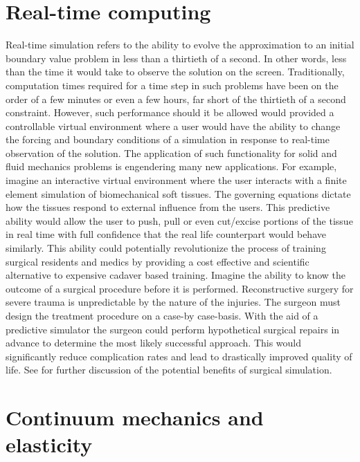 \documentclass[article]{pcms-l}
\begin{document}
\section*{Real-time computing}
Real-time simulation refers to the ability to evolve the approximation to an initial boundary value problem in less than a thirtieth of a second. In other words, less than the time it would take to observe the solution on the screen. Traditionally, computation times required for a time step in such problems have been on the order of a few minutes or even a few hours, far short of the thirtieth of a second constraint. However, such performance should it be allowed would provided a controllable virtual environment where a user would have the ability to change the forcing and boundary conditions of a simulation in response to real-time observation of the solution. The application of such functionality for solid and fluid mechanics problems is engendering many new applications. For example, imagine an interactive virtual environment where the user interacts with a finite element simulation of biomechanical soft tissues. The governing equations dictate how the tissues respond to external influence from the users. This predictive ability would allow the user to push, pull or even cut/excise portions of the tissue in real time with full confidence that the real life counterpart would behave similarly. This ability could potentially revolutionize the process of training surgical residents and medics by providing a cost effective and scientific alternative to expensive cadaver based training. Imagine the ability to know the outcome of a surgical procedure before it is performed. Reconstructive surgery for severe trauma is unpredictable by the nature of the injuries. The surgeon must design the treatment procedure on a case-by case-basis. With the aid of a predictive simulator the surgeon could perform hypothetical surgical repairs in advance to determine the most likely successful approach. This would significantly reduce complication rates and lead to drastically improved quality of life. See \cite{SHTOC09} for further discussion of the potential benefits of surgical simulation.

\section*{Continuum mechanics and elasticity}
\end{document}
